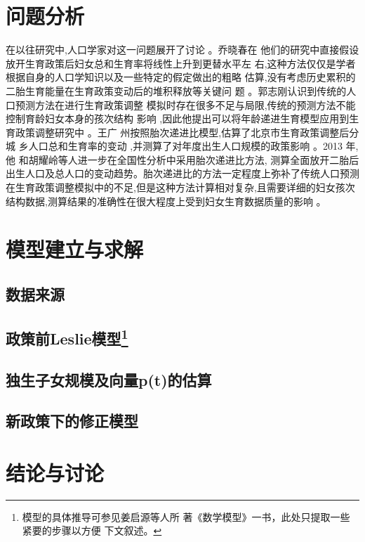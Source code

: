\documentclass[a4paper]{article}
\begin{document}
\section{问题分析}
在以往研究中,人口学家对这一问题展开了讨论 。乔晓春\cite{xiaochun06}在
他们的研究中直接假设放开生育政策后妇女总和生育率将线性上升到更替水平左
右,这种方法仅仅是学者根据自身的人口学知识以及一些特定的假定做出的粗略
估算,没有考虑历史累积的二胎生育能量在生育政策变动后的堆积释放等关键问
题 。郭志刚\cite{zhigang04}认识到传统的人口预测方法在进行生育政策调整
模拟时存在很多不足与局限,传统的预测方法不能控制育龄妇女本身的孩次结构
影响 ,因此他提出可以将年龄递进生育模型应用到生育政策调整研究中 。王广
州\cite{guangzhou11}按照胎次递进比模型,估算了北京市生育政策调整后分城
乡人口总和生育率的变动 ,并测算了对年度出生人口规模的政策影响 。2013 年,他
和胡耀岭等人进一步在全国性分析中采用胎次递进比方法\cite{guangzhou13},
测算全面放开二胎后出生人口及总人口的变动趋势。胎次递进比的方法一定程度上弥补了传统人口预测在生育政策调整模拟中的不足,但是这种方法计算相对复杂,且需要详细的妇女孩次结构数据,测算结果的准确性在很大程度上受到妇女生育数据质量的影响 。
\cite{zhenwu14}\par
\section{模型建立与求解}
\subsection{数据来源}
\subsection{政策前Leslie模型\footnote{模型的具体推导可参见姜启源等人所
    著《数学模型》\cite{qiyuan93}一书，此处只提取一些紧要的步骤以方便
    下文叙述。}}

\subsection{独生子女规模及向量\textbf{p(t)}的估算}
\subsection{新政策下的修正模型}
\section{结论与讨论}
\medskip
\printbibliography %
\end{document}
